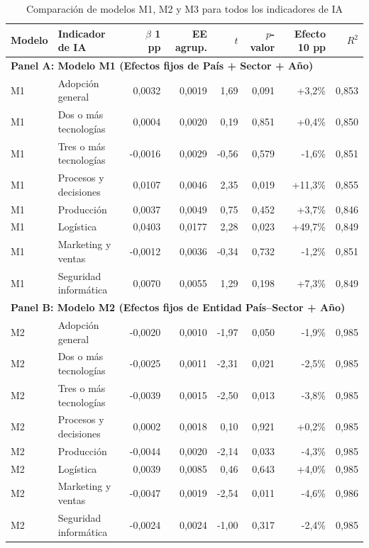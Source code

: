\documentclass[12pt,a4paper]{article}
\begin{document}
\begin{table}[H]
\centering
\caption{Comparación de modelos M1, M2 y M3 para todos los indicadores de IA}
\label{tab:anexo-especificaciones}
\scriptsize
\begin{tabularx}{\textwidth}{lXrrrrrr}
\toprule
\textbf{Modelo} & \textbf{Indicador de IA} & \textbf{$\beta$ 1 pp} & \textbf{EE agrup.} & \textbf{$t$} & \textbf{$p$-valor} & \textbf{Efecto 10 pp} & \textbf{$R^2$} \\
\midrule
\multicolumn{8}{l}{\textbf{Panel A: Modelo M1 (Efectos fijos de País + Sector + Año)}} \\
M1 & Adopción general & 0,0032 & 0,0019 & 1,69 & 0,091 & +3,2\% & 0,853 \\
M1 & Dos o más tecnologías & 0,0004 & 0,0020 & 0,19 & 0,851 & +0,4\% & 0,850 \\
M1 & Tres o más tecnologías & -0,0016 & 0,0029 & -0,56 & 0,579 & -1,6\% & 0,851 \\
M1 & Procesos y decisiones & 0,0107 & 0,0046 & 2,35 & 0,019 & +11,3\% & 0,855 \\
M1 & Producción & 0,0037 & 0,0049 & 0,75 & 0,452 & +3,7\% & 0,846 \\
M1 & Logística & 0,0403 & 0,0177 & 2,28 & 0,023 & +49,7\% & 0,849 \\
M1 & Marketing y ventas & -0,0012 & 0,0036 & -0,34 & 0,732 & -1,2\% & 0,851 \\
M1 & Seguridad informática & 0,0070 & 0,0055 & 1,29 & 0,198 & +7,3\% & 0,849 \\
\midrule
\multicolumn{8}{l}{\textbf{Panel B: Modelo M2 (Efectos fijos de Entidad País--Sector + Año)}} \\
M2 & Adopción general & -0,0020 & 0,0010 & -1,97 & 0,050 & -1,9\% & 0,985 \\
M2 & Dos o más tecnologías & -0,0025 & 0,0011 & -2,31 & 0,021 & -2,5\% & 0,985 \\
M2 & Tres o más tecnologías & -0,0039 & 0,0015 & -2,50 & 0,013 & -3,8\% & 0,985 \\
M2 & Procesos y decisiones & 0,0002 & 0,0018 & 0,10 & 0,921 & +0,2\% & 0,985 \\
M2 & Producción & -0,0044 & 0,0020 & -2,14 & 0,033 & -4,3\% & 0,985 \\
M2 & Logística & 0,0039 & 0,0085 & 0,46 & 0,643 & +4,0\% & 0,985 \\
M2 & Marketing y ventas & -0,0047 & 0,0019 & -2,54 & 0,011 & -4,6\% & 0,986 \\
M2 & Seguridad informática & -0,0024 & 0,0024 & -1,00 & 0,317 & -2,4\% & 0,985 \\

\end{tabularx}
\end{table}
\end{document}
